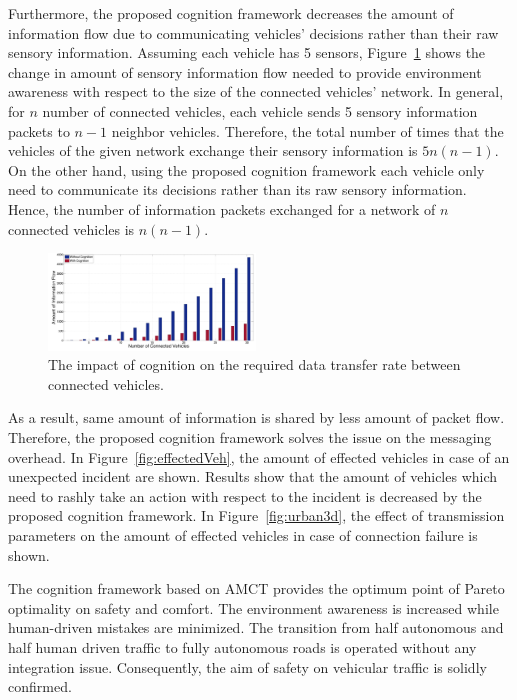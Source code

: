 \documentclass[journal, 11pt]{IEEEtran}
\begin{document}
Furthermore, the proposed cognition framework decreases the amount of
information flow due to communicating vehicles' decisions rather than their raw
sensory information. Assuming each vehicle has 5 sensors,
Figure~\ref{fig:infoFlow} shows the change in amount of sensory information flow
{\color{red}needed to provide environment awareness} with respect to the size of
the connected vehicles' network. In general, for $n$ number of connected
vehicles, each vehicle sends 5 sensory information packets to $n - 1$ neighbor
vehicles. Therefore, the total number of times that the vehicles of the given
network exchange their sensory information is $5n(n-1)$. On the other hand,
using the proposed cognition framework each vehicle only need to communicate its
decisions rather than its raw sensory information. Hence, the number of
information packets exchanged for a network of $n$ connected vehicles is
$n(n-1)$. 

\begin{figure}[!t]
  \centering
  \includegraphics[width=0.49\textwidth]{figs/infoFlow.pdf}
  \caption{{\fontsize{10}{10}\selectfont The impact of cognition on the required
  data transfer rate between connected vehicles.}}
  \label{fig:infoFlow}
   \vspace*{-8mm}
\end{figure}

{\color{red} As a result, same amount of information is shared by less amount of
packet flow. Therefore, the proposed cognition framework solves the issue on the
messaging overhead. In Figure~\ref{fig:effectedVeh}, the amount of effected
vehicles in case of an unexpected incident are shown. Results show that the
amount of vehicles which need to rashly take an action with respect to the
incident is decreased by the proposed cognition framework. In
Figure~\ref{fig:urban3d}, the effect of transmission parameters on the amount of
effected vehicles in case of connection failure is shown.

The cognition framework based on AMCT provides the optimum point of Pareto
optimality on safety and comfort. The environment awareness is increased while
human-driven mistakes are minimized. The transition from half autonomous and
half human driven traffic to fully autonomous roads is operated without any
integration issue. Consequently, the aim of safety on vehicular traffic is
solidly confirmed.}
\end{document}
